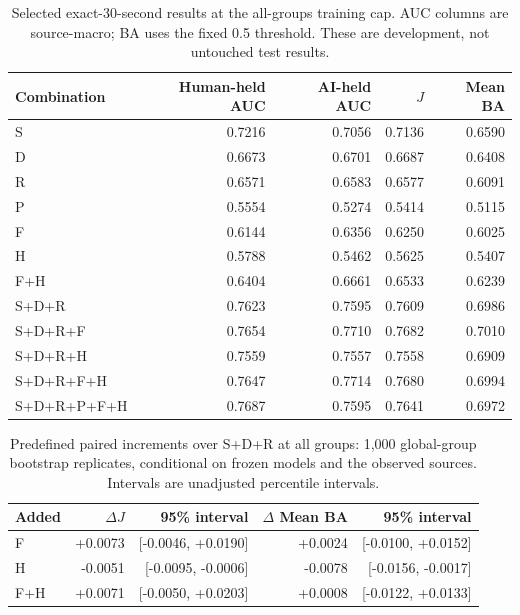 \begin{table}[htbp]
\centering\small
\caption{Selected exact-30-second results at the all-groups training cap. AUC columns are source-macro; BA uses the fixed 0.5 threshold. These are development, not untouched test results.}
\label{tab:fh30-main}
\begin{tabular}{lrrrr}
\toprule Combination & Human-held AUC & AI-held AUC & $J$ & Mean BA \\
\midrule
S & 0.7216 & 0.7056 & 0.7136 & 0.6590 \\
D & 0.6673 & 0.6701 & 0.6687 & 0.6408 \\
R & 0.6571 & 0.6583 & 0.6577 & 0.6091 \\
P & 0.5554 & 0.5274 & 0.5414 & 0.5115 \\
F & 0.6144 & 0.6356 & 0.6250 & 0.6025 \\
H & 0.5788 & 0.5462 & 0.5625 & 0.5407 \\
F+H & 0.6404 & 0.6661 & 0.6533 & 0.6239 \\
S+D+R & 0.7623 & 0.7595 & 0.7609 & 0.6986 \\
S+D+R+F & 0.7654 & 0.7710 & 0.7682 & 0.7010 \\
S+D+R+H & 0.7559 & 0.7557 & 0.7558 & 0.6909 \\
S+D+R+F+H & 0.7647 & 0.7714 & 0.7680 & 0.6994 \\
S+D+R+P+F+H & 0.7687 & 0.7595 & 0.7641 & 0.6972 \\
\bottomrule
\end{tabular}
\end{table}

\begin{table}[htbp]
\centering\small
\caption{Predefined paired increments over S+D+R at all groups: 1,000 global-group bootstrap replicates, conditional on frozen models and the observed sources. Intervals are unadjusted percentile intervals.}
\label{tab:fh30-group-ci}
\begin{tabular}{lrrrr}
\toprule Added & $\Delta J$ & 95\% interval & $\Delta$ Mean BA & 95\% interval \\
\midrule
F & +0.0073 & [-0.0046, +0.0190] & +0.0024 & [-0.0100, +0.0152] \\
H & -0.0051 & [-0.0095, -0.0006] & -0.0078 & [-0.0156, -0.0017] \\
F+H & +0.0071 & [-0.0050, +0.0203] & +0.0008 & [-0.0122, +0.0133] \\
\bottomrule
\end{tabular}
\end{table}

